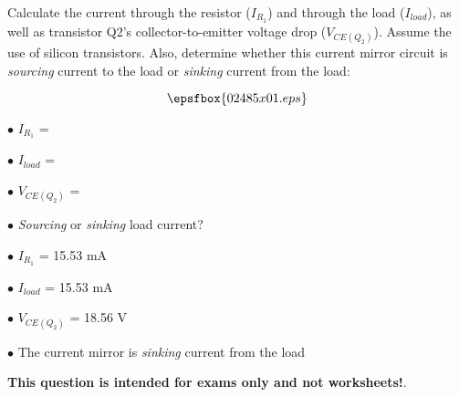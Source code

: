 

Calculate the current through the resistor ($I_{R_1}$) and through the load ($I_{load}$), as well as transistor Q2's collector-to-emitter voltage drop ($V_{CE(Q_2)}$).  Assume the use of silicon transistors.  Also, determine whether this current mirror circuit is {\it sourcing} current to the load or {\it sinking} current from the load:

$$\epsfbox{02485x01.eps}$$

\medskip
\item{$\bullet$} $I_{R_1}$ = 
\item{$\bullet$} $I_{load}$ = 
\item{$\bullet$} $V_{CE(Q_2)}$ = 
\item{$\bullet$} {\it Sourcing} or {\it sinking} load current?
\medskip







\medskip
\item{$\bullet$} $I_{R_1}$ = 15.53 mA
\item{$\bullet$} $I_{load}$ = 15.53 mA
\item{$\bullet$} $V_{CE(Q_2)}$ = 18.56 V
\item{$\bullet$} The current mirror is {\it sinking} current from the load
\medskip







{\bf This question is intended for exams only and not worksheets!}.




